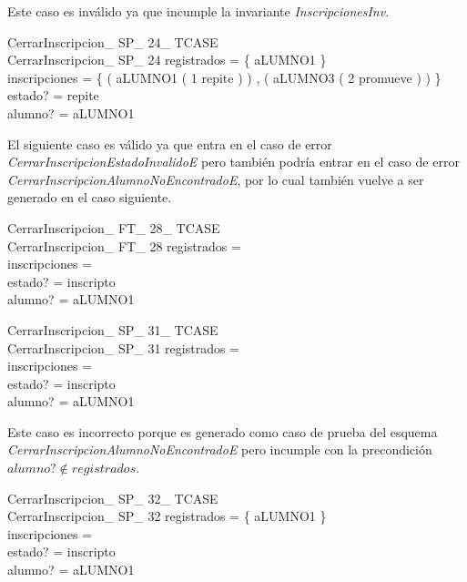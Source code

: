 \documentclass{article}
\begin{document}
Este caso es inválido ya que incumple la invariante \emph{InscripcionesInv}.
\begin{schema}{CerrarInscripcion\_ SP\_ 24\_ TCASE}\\
 CerrarInscripcion\_ SP\_ 24 
\where
 registrados = \{ aLUMNO1 \} \\
 inscripciones = \{ ( aLUMNO1 \mapsto ( 1 \mapsto repite ) ) , ( aLUMNO3 \mapsto ( 2 \mapsto promueve ) ) \} \\
 estado? = repite \\
 alumno? = aLUMNO1
\end{schema}

El siguiente caso es válido ya que entra en el caso de error \emph{CerrarInscripcionEstadoInvalidoE} pero también podría entrar en el caso de error \emph{CerrarInscripcionAlumnoNoEncontradoE}, por lo cual también vuelve a ser generado en el caso siguiente.
\begin{schema}{CerrarInscripcion\_ FT\_ 28\_ TCASE}\\
 CerrarInscripcion\_ FT\_ 28 
\where
 registrados =~\emptyset \\
 inscripciones =~\emptyset \\
 estado? = inscripto \\
 alumno? = aLUMNO1
\end{schema}


\begin{schema}{CerrarInscripcion\_ SP\_ 31\_ TCASE}\\
 CerrarInscripcion\_ SP\_ 31 
\where
 registrados =~\emptyset \\
 inscripciones =~\emptyset \\
 estado? = inscripto \\
 alumno? = aLUMNO1
\end{schema}

Este caso es incorrecto porque es generado como caso de prueba del esquema \emph{CerrarInscripcionAlumnoNoEncontradoE} pero incumple con la precondición $alumno? \notin registrados$.
\begin{schema}{CerrarInscripcion\_ SP\_ 32\_ TCASE}\\
 CerrarInscripcion\_ SP\_ 32 
\where
 registrados = \{ aLUMNO1 \} \\
 inscripciones =~\emptyset \\
 estado? = inscripto \\
 alumno? = aLUMNO1
\end{schema}
\end{document}
